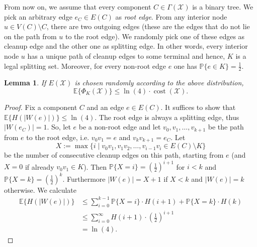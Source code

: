 \documentclass[11pt, letterpaper]{article}
\newtheorem{lemma}[theorem]{Lemma}
\theoremstyle{definition}
\DeclareMathOperator{\cost}{cost}
\newcommand{\grphx}{\mathcal{X}}
\newcommand{\compof}[1]{\Gamma(#1)}
\newcommand{\compx}{\compof{\grphx}}
\newcommand{\grd}{E(\grphx)}
\newcommand{\core}{K}
\newcommand{\pot}[2]{\Phi_{#1}(#2)}
\newcommand{\Pot}{\pot{\core}{\grphx}}
\newcommand{\E}[1]{\mathbb{E}\{#1\}}
\newcommand{\card}[1]{\lvert#1\rvert}
\renewcommand{\Pr}[1]{\mathbb{P}\{#1\}}
\begin{document}
From now on, we assume that every component $C \in \compx$ is a binary tree. 
We pick an arbitrary edge $e_C \in E(C)$ as \emph{root edge}. From any interior
node $u \in V(C) \setminus C$, there are two outgoing edges (these are the edges 
that do not lie on the path from $u$ to the root edge). We randomly pick 
one of these edges as cleanup edge and the other one as splitting edge.
In other words, every interior node $u$ has a unique path of cleanup edges to some terminal and hence, $K$ is a legal splitting set.
Moreover, for every non-root edge $e$ one has $\Pr{e \in K} = \frac{1}{2}$.  
\begin{lemma}
	If $\grd$ is chosen randomly according to the above distribution, 
\[ \E{\Pot} \leq \ln(4) \cdot \cost(\grphx). \]
\end{lemma}
\begin{proof}
Fix a component $C$ and an edge $e \in E(C)$. It suffices to show that
$\E{H( \card{W(e)})} \leq \ln(4)$. 
The root edge is always a splitting edge, thus $|W(e_C)| = 1$. So, let $e$
be a non-root edge and let $v_0,v_1,\ldots,v_{k+1}$ be the path from $e$ to the 
root edge, i.e. $v_0v_1=e$ and $v_kv_{k+1}=e_C$. Let 
\[ X := \max\{ i \mid v_0v_1,v_1v_2,\ldots,v_{i-1}v_{i} \in E(C) \setminus K\} \]
be the number of consecutive cleanup edges on this path, starting 
from $e$ (and $X=0$ if already $v_0v_1 \in \core$). Then $\Pr{X = i} = (\frac{1}{2})^{i+1}$ for $i<k$ and $\Pr{X = k} = (\frac{1}{2})^{k}$.
Furthermore $|W(e)| = X+1$ if $X<k$ and $|W(e)| = k$ otherwise. 
We calculate
\begin{align*}
 \E{H( |W(e)| )} &\leq \sum_{i=0}^{k-1} \Pr{X=i} \cdot H(i+1)+\Pr{X=k} \cdot H(k)\\
 &\leq \sum_{i=0}^{\infty} H(i+1) \cdot \left(\frac{1}{2}\right)^{i+1}\\
 &= \ln(4). 
 \end{align*}

\end{proof}
 
\end{document}
